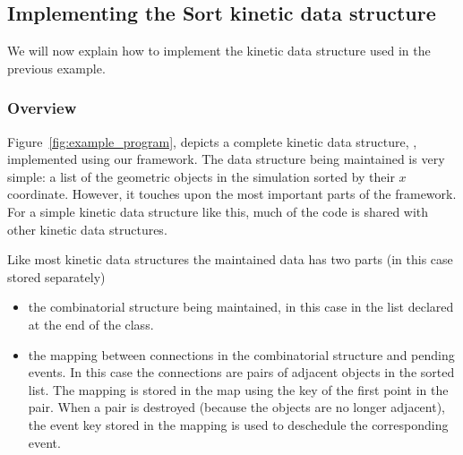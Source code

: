 \subsection{Implementing the Sort kinetic data structure}
\label{sec:sort_kds_overview}
We will now explain how to implement the kinetic data structure used in the previous example. 

\subsubsection{Overview}


Figure~\ref{fig:example_program}, depicts a complete kinetic data
structure, , implemented using our
framework. The data structure being maintained is very simple: a list
of the geometric objects in the simulation sorted by their $x$
coordinate. However, it touches upon the most important parts of the
framework. For a simple kinetic data structure like this, much of the
code is shared with other kinetic data structures. 

Like most kinetic data structures the maintained data has
two parts (in this case stored separately)
\begin{itemize}
\item the combinatorial structure being maintained, in this case in the
list  declared at the end of the class.
\item the mapping between connections in the combinatorial structure and 
pending events. In this case the connections are pairs of adjacent
objects in the sorted list. The mapping is stored in the map
 using the key of the first point in the pair.
When a pair is destroyed (because the objects are no longer adjacent),
the event key stored in the mapping is used to deschedule the
corresponding event.
\end{itemize}

